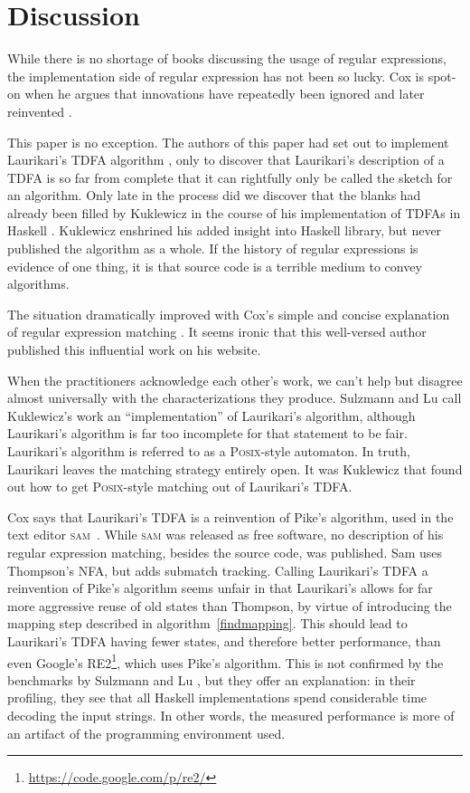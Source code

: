 \documentclass[11pt,a4paper,twoside,openright]{Thesis}
\theoremstyle{definition}
\newcommand{\seclabel}[1]{\label{sec:#1}}
\begin{document}
\section{Discussion}\seclabel{discuss-related}
While there is no shortage of books discussing the usage of regular
expressions, the implementation side of regular expression has not
been so lucky. Cox is spot-on when he argues that innovations have
repeatedly been ignored and later reinvented \cite{Cox07a,Cox09a,Cox10a}.

This paper is no exception. The authors of this paper had set out to implement
Laurikari's TDFA algorithm \cite{Laur00a}, only to discover that Laurikari's
description of a TDFA is so far from complete that it can rightfully only be
called the sketch for an algorithm. Only late in the process did we discover
that the blanks had already been filled by Kuklewicz in the course of his
implementation of TDFAs in Haskell \cite{Kukl07a}. Kuklewicz enshrined his
added insight into Haskell library, but never published the algorithm as a
whole. If the history of regular expressions is evidence of one thing, it is
that source code is a terrible medium to convey algorithms.

The situation dramatically improved with Cox's simple and concise
explanation of regular expression matching \cite{Cox07a}. It seems
ironic that this well-versed author published this influential work
on his website.

When the practitioners acknowledge each other's work, we can't
help but disagree almost universally with the characterizations they
produce. Sulzmann and Lu \cite{Sulz12a} call Kuklewicz's
work an ``implementation'' of Laurikari's algorithm, although Laurikari's
algorithm is far too incomplete for that statement to be fair. Laurikari's
algorithm is referred to as a \textsc{Posix}-style automaton. In truth, Laurikari
leaves the matching strategy entirely open. It was Kuklewicz that
found out how to get \textsc{Posix}-style matching out of Laurikari's TDFA.

Cox says that Laurikari's TDFA is a reinvention of Pike's algorithm,
used in the text editor \textsc{sam}~\cite{Pike87a}.  While \textsc{sam} was
released as free software, no description of his regular expression matching,
besides the source code, was published.  Sam uses Thompson's NFA, but adds
submatch tracking. Calling Laurikari's TDFA a reinvention of Pike's algorithm
seems unfair in that Laurikari's allows for far more aggressive reuse of old
states than Thompson, by virtue of introducing the mapping step described in
algorithm~\ref{findmapping}. This should lead to Laurikari's TDFA having fewer
states, and therefore better performance, than even Google's
\textsc{RE2}\footnote{\url{https://code.google.com/p/re2/}}, which uses Pike's
algorithm. This is not confirmed by the benchmarks by Sulzmann and Lu
\cite{Sulz12a}, but they offer an explanation: in their profiling, they see
that all Haskell implementations spend considerable time decoding the input
strings. In other words, the measured performance is more of an artifact of the
programming environment used.
\end{document}
